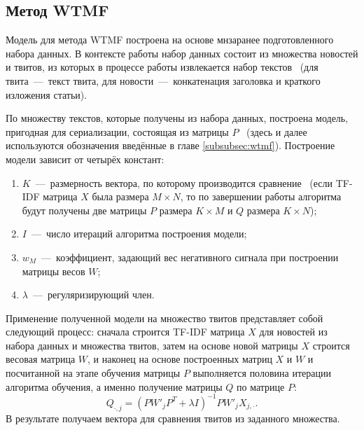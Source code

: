 \subsection{Метод WTMF}
    Модель для метода WTMF построена на основе мнзаранее подготовленного набора данных.
    В контексте работы набор данных состоит из множества новостей и твитов, из которых в процессе работы извлекается набор текстов
    ~(для твита~---~текст твита, для новости~---~конкатенация заголовка и краткого изложения статьи).

    По множеству текстов, которые получены из набора данных, построена модель, пригодная для сериализации, состоящая из матрицы $P$
    ~(здесь и далее используются обозначения введённые в главе \ref{subsubsec:wtmf}).
    Построение модели зависит от четырёх констант:
    \begin{enumerate}
        \item $K$~---~размерность вектора, по которому производится сравнение~
        (если TF-IDF матрица $X$ была размера $M \times N$, то по завершении работы алгоритма будут получены две матрицы $P$ размера $K \times M$ и $Q$ размера $K \times N$);
        \item $I$~---~число итераций алгоритма построения модели;
        \item $w_M$~---~коэффициент, задающий вес негативного сигнала при построении матрицы весов $W$;
        \item $\lambda$~---~регуляризирующий член.
    \end{enumerate}

    Применение полученной модели на множество твитов представляет собой следующий процесс:
    сначала строится TF-IDF матрица $X$ для новостей из набора данных и множества твитов, затем на основе новой матрицы $X$ строится весовая матрица $W$,
    и наконец на основе построенных матриц $X$ и $W$ и посчитанной на этапе обучения матрицы $P$ выполняется половина итерации алгоритма обучения,
    а именно получение матрицы $Q$ по матрице $P$:
    $$Q_{\cdot, j} = (P W'_j P^T + \lambda I)^{-1} P W'_j X_{j,\cdot}.$$
    В результате получаем вектора для сравнения твитов из заданного множества.